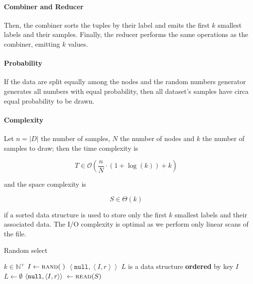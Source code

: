 \documentclass[parskip=full]{report}
\begin{document}
\paragraph{Combiner and Reducer}
Then, the combiner sorts the tuples by their label and emits the first $k$
smallest labels and their samples. Finally, the reducer performs the same
operations as the combiner, emitting $k$ values.

\paragraph{Probability}
If the data are split equally among the nodes and the random numbers generator generates all numbers with equal probability, then all dataset's samples have circa equal probability to be drawn.

\paragraph{Complexity}
Let $n = |D|$ the number of samples, $N$ the number of nodes and $k$ the number of samples to draw; then the time complexity is

\[
T \in \mathcal{O} \left(\dfrac{n}{N} \cdot \left(1 + \log(k)\right) + k \right)
\]

and the space complexity is

\[
S \in \Theta \left(k\right)
\]

if a sorted data structure is used to store only the first $k$ smallest labels
and their associated data. The I/O complexity is optimal as we perform only linear scans of the file.

\begin{algorithm}[H]
	\caption{Random select}\label{alg:random_map}
	\begin{algorithmic}
		\Require $k \in \mathbb{N}^+$
			\State $I \gets \Call{rand}{\;}$
			\State \Return $\left< \texttt{null}, \left< I, r\right> \right>$
		\EndProcedure
		\vspace{.25cm}
			\State $L$ is a data structure \textbf{ordered} by key $I$
			\State $L \gets \emptyset$
				\State $\left< \texttt{null}, \left< I, r\right> \right> \
					\gets \Call{read}{S}$
				\State {}
					\State {}
				\EndIf

				\State {}
			\EndWhile
				\State {}
			\EndFor
		\EndProcedure
		\vspace{.25cm}
			\State {} 
		\EndProcedure
	\end{algorithmic}
\end{algorithm}
\end{document}
